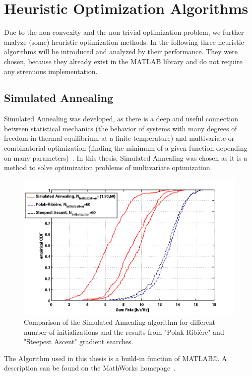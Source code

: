\section{Heuristic Optimization Algorithms}
\label{sec:heuristic}
Due to the non convexity and the non trivial optimization problem, we further analyze (some) heuristic optimization methods.
In the following three heuristic algorithms will be introduced and analyzed by their performance.
They were chosen, because they already exist in the MATLAB library and do not require any strenuous implementation.

\subsection{Simulated Annealing}
\label{sec:sim_annealing}
Simulated Annealing was developed, as there is a deep and useful connection between statistical mechanics (the behavior of systems with many degrees of freedom in thermal equilibrium at a finite temperature) and multivariate or combinatorial optimization (finding the minimum of a given function depending on many parameters)~\cite{Kirkpatrick83}.
In this thesis, Simulated Annealing was chosen as it is a method to solve optimization problems of multivariate optimization.
\begin{figure}[h]
\centering
  \includegraphics[width=0.8\linewidth]{images/Simannealcomparison.png}
\caption{Comparison of the Simulated Annealing algorithm for different number of initializations and the results from "Polak-Ribi\`{e}re" and "Steepest Ascent" gradient searches.}
\label{fig:heur_sa}
\end{figure}

The Algorithm used in this thesis is a build-in function of MATLAB\copyright.
A description can be found on the MathWorks homepage~\cite{matlab:simulann}.



